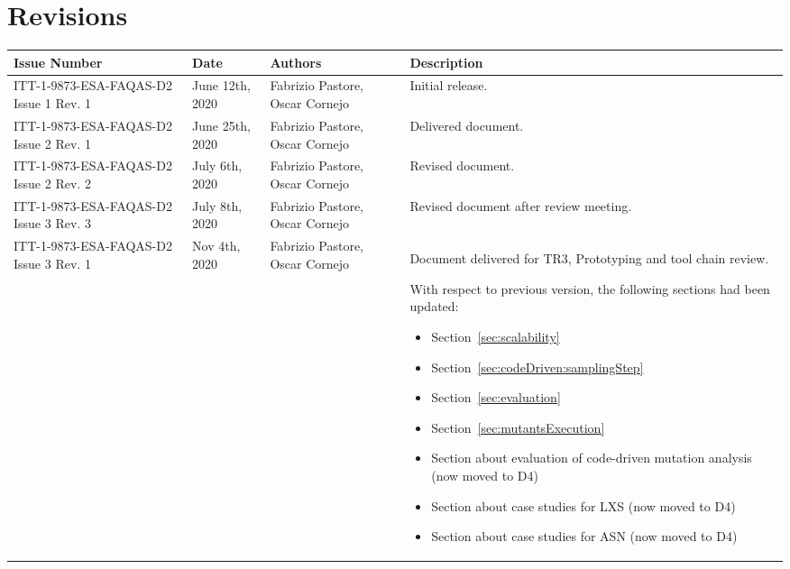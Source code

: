
\section*{Revisions}
\label{sec:revisions}


\setlength\LTleft{0pt}
\setlength\LTright{0pt}
\tiny 
\begin{longtable}{|p{2cm}|p{1cm}|p{1.5cm}|p{9cm}|@{}}
\label{table:codeoperators} \\
\hline
\textbf{Issue Number}&\textbf{Date}&\textbf{Authors}&\textbf{Description}\\
\hline
ITT-1-9873-ESA-FAQAS-D2
Issue 1 Rev. 1&
June 12th, 2020&
Fabrizio Pastore, Oscar Cornejo&
\begin{minipage}{8cm}
Initial release.
\end{minipage}
\\
\hline
ITT-1-9873-ESA-FAQAS-D2
Issue 2 Rev. 1&
June 25th, 2020&
Fabrizio Pastore, Oscar Cornejo&
\begin{minipage}{8cm}
Delivered document.
\end{minipage}
\\
\hline
ITT-1-9873-ESA-FAQAS-D2
Issue 2 Rev. 2&
July 6th, 2020&
Fabrizio Pastore, Oscar Cornejo&
\begin{minipage}{8cm}
Revised document.
\end{minipage}
\\
\hline
ITT-1-9873-ESA-FAQAS-D2
Issue 3 Rev. 3&
July 8th, 2020&
Fabrizio Pastore, Oscar Cornejo&
\begin{minipage}{8cm}
Revised document after review meeting.
\end{minipage}
\\
\hline
ITT-1-9873-ESA-FAQAS-D2
Issue 3 Rev. 1&
Nov 4th, 2020&
Fabrizio Pastore, Oscar Cornejo&
\begin{minipage}{8cm}
Document delivered for TR3, Prototyping and tool chain review.

With respect to previous version, the following sections had been updated:
\begin{itemize}
\item Section~\ref{sec:scalability}
\item Section~\ref{sec:codeDriven:samplingStep}
\item Section~\ref{sec:evaluation}
\item Section~\ref{sec:mutantsExecution}
\item Section about evaluation of code-driven mutation analysis (now moved to D4)
\item Section about case studies for LXS (now moved to D4)
\item Section about case studies for ASN (now moved to D4)
\end{itemize}


\end{minipage}
\end{longtable}
